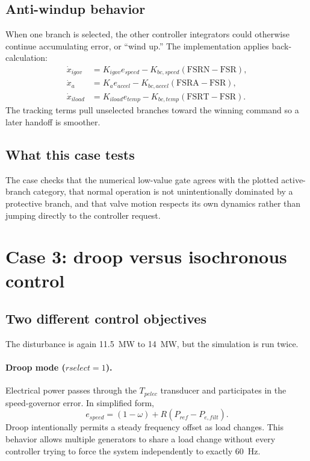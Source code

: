 \documentclass[11pt]{article}
\newcommand{\fsrn}{\ensuremath{\mathrm{FSRN}}}
\newcommand{\fsra}{\ensuremath{\mathrm{FSRA}}}
\newcommand{\fsrt}{\ensuremath{\mathrm{FSRT}}}
\newcommand{\fsr}{\ensuremath{\mathrm{FSR}}}
\begin{document}
\subsection{Anti-windup behavior}
When one branch is selected, the other controller integrators could otherwise
continue accumulating error, or ``wind up.''  The implementation applies
back-calculation:
\begin{align}
  \dot x_{igov} &= K_{igov}e_{speed}
    -K_{bc,speed}(\fsrn-\fsr),\\
  \dot x_a &= K_ae_{accel}
    -K_{bc,accel}(\fsra-\fsr),\\
  \dot x_{iload} &= K_{iload}e_{temp}
    -K_{bc,temp}(\fsrt-\fsr).
\end{align}
The tracking terms pull unselected branches toward the winning command so a
later handoff is smoother.

\subsection{What this case tests}
The case checks that the numerical low-value gate agrees with the plotted
active-branch category, that normal operation is not unintentionally dominated
by a protective branch, and that valve motion respects its own dynamics rather
than jumping directly to the controller request.

\section{Case 3: droop versus isochronous control}

\subsection{Two different control objectives}
The disturbance is again \SI{11.5}{MW} to \SI{14}{MW}, but the simulation is
run twice.

\paragraph{Droop mode ($rselect=1$).}
Electrical power passes through the $T_{pelec}$ transducer and participates in
the speed-governor error.  In simplified form,
\begin{equation}
  e_{speed}=(1-\omega)+R(P_{ref}-P_{e,filt}).
  \label{eq:droop}
\end{equation}
Droop intentionally permits a steady frequency offset as load changes.  This
behavior allows multiple generators to share a load change without every
controller trying to force the system independently to exactly \SI{60}{Hz}.
\end{document}
